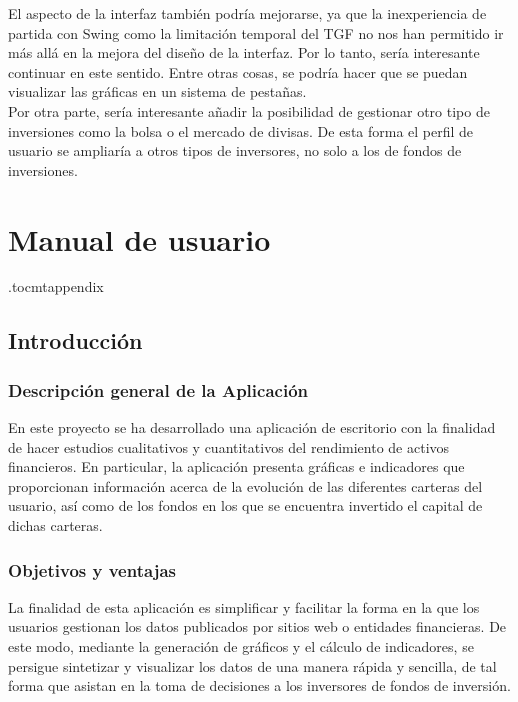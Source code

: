 \documentclass[12pt, a4paper]{book}
\begin{document}
El aspecto de la interfaz también podría mejorarse, ya que la inexperiencia de partida con Swing como la limitación temporal del TGF no nos han permitido ir más allá en la mejora del diseño de la interfaz. Por lo tanto, sería interesante continuar en este sentido. Entre otras cosas, se podría hacer que se puedan visualizar las gráficas en un sistema de pestañas.
\\

Por otra parte, sería interesante añadir la posibilidad de gestionar otro tipo de inversiones como la bolsa o el mercado de divisas. De esta forma el perfil de usuario se ampliaría a otros tipos de inversores, no solo a los de fondos de inversiones.




\appendix
\chapter{Manual de usuario}\label{aped.A}

\etocdepthtag.toc{mtappendix}

\renewcommand{\contentsname}{Índice del manual de usuario}

\tableofcontents

\newpage

\section{Introducción}

\subsection{Descripción general de la Aplicación}

En este proyecto se ha desarrollado una aplicación de escritorio con la finalidad de hacer estudios cualitativos y cuantitativos del rendimiento de activos financieros. En particular, la aplicación presenta gráficas e indicadores que proporcionan información acerca de la evolución de las diferentes carteras del usuario, así como de los fondos en los que se encuentra invertido el capital de dichas carteras.

\subsection{Objetivos y ventajas}

La finalidad de esta aplicación es simplificar y facilitar la forma en la que los usuarios gestionan los datos publicados por sitios web o entidades financieras. De este modo, mediante la generación de gráficos y el cálculo de indicadores, se persigue sintetizar y visualizar los datos de una manera rápida y sencilla, de tal forma que asistan en la toma de decisiones a los inversores de fondos de inversión.
\end{document}
